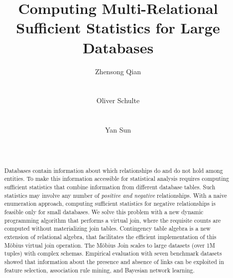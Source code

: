 \documentclass{acm_proc_article-sp}
\begin{document}
\title{Computing Multi-Relational Sufficient Statistics for  Large Databases}

\author{
\alignauthor
Zhensong Qian\\
       \\
       \\
\alignauthor
Oliver Schulte \\
       \\
       \\
\alignauthor
Yan Sun\\
       \\
       \\
}
\maketitle  

\begin{abstract} Databases contain information about which relationships do and do not hold among entities. To make this information accessible for statistical analysis requires computing sufficient statistics  that combine information from different database tables. Such statistics may involve any number of {\em positive and negative} relationships. With a naive enumeration approach, computing sufficient statistics for negative relationships is feasible only for small databases. We solve this problem with a new dynamic programming algorithm that performs a virtual join, where the requisite counts are computed without materializing join tables. 
Contingency table algebra is a new extension of relational algebra, that facilitates the efficient implementation of this M\"obius virtual join operation. 
The M\"obius Join scales to large datasets (over 1M tuples) with complex schemas. Empirical evaluation with seven benchmark datasets showed that information about the presence and absence of links can be exploited in feature selection, association rule mining, and Bayesian network learning. 

 \end{abstract}

\end{document}
